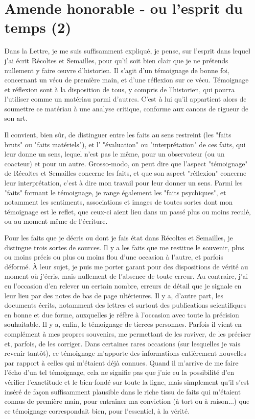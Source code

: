 \section{Amende honorable - ou l'esprit du temps (2)}

Dans la Lettre, je me suis suffisamment expliqué, je pense, sur l'esprit dans lequel j'ai écrit Récoltes et Semailles, pour qu'il soit bien clair que je ne prétends nullement y faire œuvre d'historien. Il s'agit d'un témoignage de bonne foi, concernant un vécu de première main, et d'une réflexion sur ce vécu. Témoignage et réflexion sont à la disposition de tous, y compris de l'historien, qui pourra l'utiliser comme un matériau parmi d'autres. C'est à lui qu'il appartient alors de soumettre ce matériau à une analyse critique, conforme aux canons de rigueur de son art.

Il convient, bien sûr, de distinguer entre les faits au sens restreint (les "faits bruts" ou "faits matériels"), et l' "évaluation" ou "interprétation" de ces faits, qui leur donne un sens, lequel n'est pas le même, pour un observateur (ou un coacteur) et pour un autre. Grosso-modo, on peut dire que l'aspect "témoignage" de Récoltes et Semailles concerne les faits, et que son aspect "réflexion" concerne leur interprétation, c'est à dire mon travail pour leur donner un sens. Parmi les "faits" formant le témoignage, je range également les "faits psychiques", et notamment les sentiments, associations et images de toutes sortes dont mon témoignage est le reflet, que ceux-ci aient lieu dans un passé plus ou moins reculé, ou au moment même de l'écriture.

Pour les faits que je décris ou dont je fais état dans Récoltes et Semailles, je distingue trois sortes de sources. Il y a les faits que me restitue le souvenir, plus ou moins précis ou plus ou moins flou d'une occasion à l'autre, et parfois déformé. À leur sujet, je puis me porter garant pour des dispositions de vérité au moment où j'écris, mais nullement de l'absence de toute erreur. Au contraire, j'ai eu l'occasion d'en relever un certain nombre, erreurs de détail que je signale en leur lieu par des notes de bas de page ultérieures. Il y a, d'autre part, les documents écrits, notamment des lettres et surtout des publications scientifiques en bonne et due forme, auxquelles je réfère à l'occasion avec toute la précision souhaitable. Il y a, enfin, le témoignage de tierces personnes. Parfois il vient en complément à mes propres souvenirs, me permettant de les raviver, de les préciser et, parfois, de les corriger. Dans certaines rares occasions (sur lesquelles je vais revenir tantôt), ce témoignage m'apporte des informations entièrement nouvelles par rapport à celles qui m'étaient déjà connues. Quand il m'arrive de me faire l'écho d'un tel témoignage, cela ne signifie pas que j'aie eu la possibilité d'en vérifier l'exactitude et le bien-fondé sur toute la ligne, mais simplement qu'il s'est inséré de façon suffisamment plausible dans le riche tissu de faits qui m'étaient connus de première main, pour entraîner ma conviction (à tort ou à raison...) que ce témoignage correspondait bien, pour l'essentiel, à la vérité.


